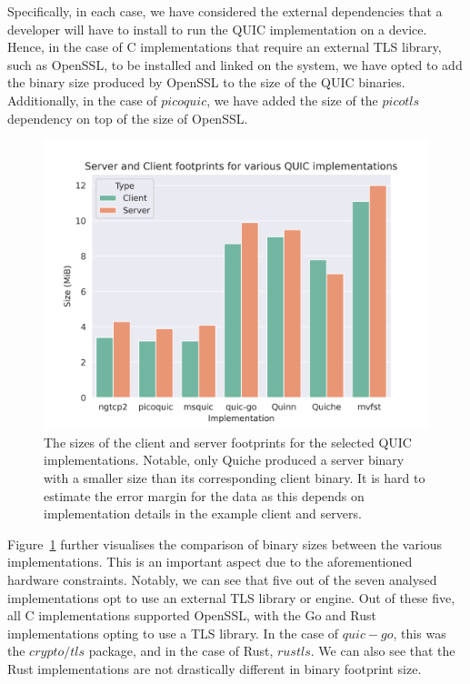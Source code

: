 Specifically, in each case, we have considered the external dependencies that a developer will have to install to run the QUIC implementation on a device.
Hence, in the case of C implementations that require an external TLS library, such as OpenSSL, to be installed and linked on the system, we have opted to add the binary size produced by OpenSSL to the size of the QUIC binaries.
Additionally, in the case of $picoquic$, we have added the size of the $picotls$ dependency on top of the size of OpenSSL.

\begin{figure}[ht]
    \centering
    \includegraphics[width=1\linewidth]{images/quic_impls.png}
    \caption{The sizes of the client and server footprints for the selected QUIC implementations. Notable, only Quiche produced a server binary with a smaller size than its corresponding client binary. It is hard to estimate the error margin for the data as this depends on implementation details in the example client and servers.}
    \label{fig:quic_impls}
\end{figure}

Figure~\ref{fig:quic_impls} further visualises the comparison of binary sizes between the various implementations.
This is an important aspect due to the aforementioned hardware constraints.
Notably, we can see that five out of the seven analysed implementations opt to use an external TLS library or engine.
Out of these five, all C implementations supported OpenSSL, with the Go and Rust implementations opting to use a TLS library.
In the case of $quic-go$, this was the $crypto/tls$ package, and in the case of Rust, $rustls$.
We can also see that the Rust implementations are not drastically different in binary footprint size.

